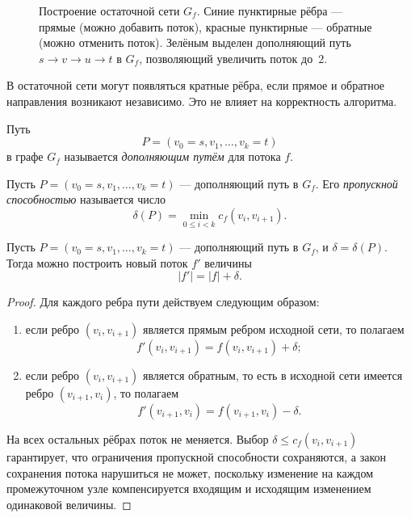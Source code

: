 \begin{figure}[htb]
	\caption{Построение остаточной сети $G_f$.
		Синие пунктирные рёбра — прямые (можно добавить поток),
		красные пунктирные — обратные (можно отменить поток).
		Зелёным выделен дополняющий путь $s\to v\to u\to t$ в $G_f$,
		позволяющий увеличить поток до~$2$.}
	\label{fig:residual}
\end{figure}

\begin{Remark}{}{}
	В остаточной сети могут появляться кратные рёбра, если прямое и обратное направления возникают независимо. Это не влияет на корректность алгоритма.
\end{Remark}

\begin{Definition}{}{}
	Путь
	\[
	P=(v_0=s,v_1,\dots,v_k=t)
	\]
	в графе $G_f$ называется \emph{дополняющим путём} для потока $f$.
\end{Definition}

\begin{Definition}{}{}
	Пусть $P=(v_0=s,v_1,\dots,v_k=t)$ --- дополняющий путь в $G_f$. Его \emph{пропускной способностью} называется число
	\[
	\delta(P)=\min_{0\le i<k} c_f(v_i,v_{i+1}).
	\]
\end{Definition}

\begin{Proposition}{}{}
	Пусть $P=(v_0=s,v_1,\dots,v_k=t)$ --- дополняющий путь в $G_f$, и $\delta=\delta(P)$. Тогда можно построить новый поток $f'$ величины
	\[
	|f'|=|f|+\delta.
	\]
\end{Proposition}

\begin{proof}
	Для каждого ребра пути действуем следующим образом:
	\begin{enumerate}[label=\arabic*)]
		\item если ребро $(v_i,v_{i+1})$ является прямым ребром исходной сети, то полагаем
		\[
		f'(v_i,v_{i+1})=f(v_i,v_{i+1})+\delta;
		\]
		\item если ребро $(v_i,v_{i+1})$ является обратным, то есть в исходной сети имеется ребро $(v_{i+1},v_i)$, то полагаем
		\[
		f'(v_{i+1},v_i)=f(v_{i+1},v_i)-\delta.
		\]
	\end{enumerate}
	На всех остальных рёбрах поток не меняется. Выбор $\delta \le c_f(v_i,v_{i+1})$
	гарантирует, что ограничения пропускной способности сохраняются, а закон сохранения потока нарушиться не может, поскольку изменение на каждом промежуточном узле компенсируется входящим и исходящим изменением одинаковой величины.
\end{proof}

